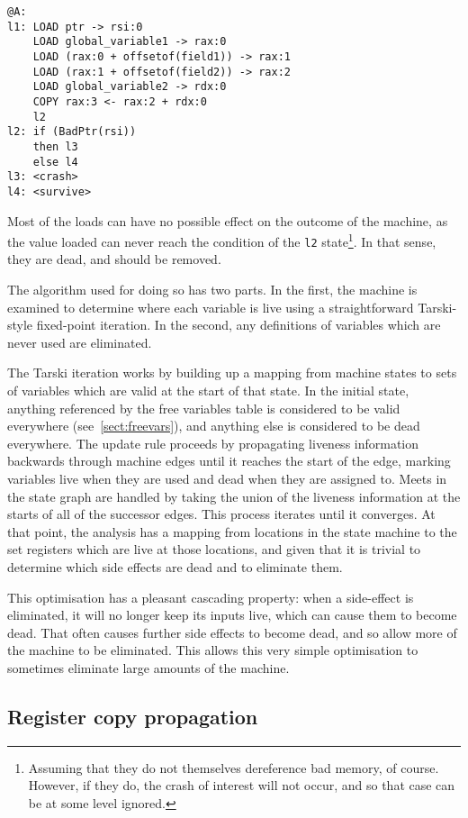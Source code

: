 \documentclass[12pt,a4paper]{book}
\begin{document}
\begin{verbatim}
@A:
l1: LOAD ptr -> rsi:0
    LOAD global_variable1 -> rax:0
    LOAD (rax:0 + offsetof(field1)) -> rax:1
    LOAD (rax:1 + offsetof(field2)) -> rax:2
    LOAD global_variable2 -> rdx:0
    COPY rax:3 <- rax:2 + rdx:0
    l2
l2: if (BadPtr(rsi))
    then l3
    else l4
l3: <crash>
l4: <survive>
\end{verbatim}

Most of the loads can have no possible effect on the outcome of the machine, as the value loaded can never reach the condition of the \verb|l2| state\footnote{Assuming that they do not themselves dereference bad memory, of course.  However, if they do, the crash of interest will not occur, and so that case can be at some level ignored.}.
In that sense, they are dead, and should be removed.

The algorithm used for doing so has two parts.
In the first, the machine is examined to determine where each variable is live using a straightforward Tarski-style fixed-point iteration.
In the second, any definitions of variables which are never used are eliminated.

The Tarski iteration works by building up a mapping from machine states to sets of variables which are valid at the start of that state.
In the initial state, anything referenced by the free variables table is considered to be valid everywhere (see~\ref{sect:freevars}), and anything else is considered to be dead everywhere.
The update rule proceeds by propagating liveness information backwards through machine edges until it reaches the start of the edge, marking variables live when they are used and dead when they are assigned to.
Meets in the state graph are handled by taking the union of the liveness information at the starts of all of the successor edges.
This process iterates until it converges.
At that point, the analysis has a mapping from locations in the state machine to the set registers which are live at those locations, and given that it is trivial to determine which side effects are dead and to eliminate them.

This optimisation has a pleasant cascading property: when a side-effect is eliminated, it will no longer keep its inputs live, which can cause them to become dead.
That often causes further side effects to become dead, and so allow more of the machine to be eliminated.
This allows this very simple optimisation to sometimes eliminate large amounts of the machine.

\subsection{Register copy propagation}
\end{document}
